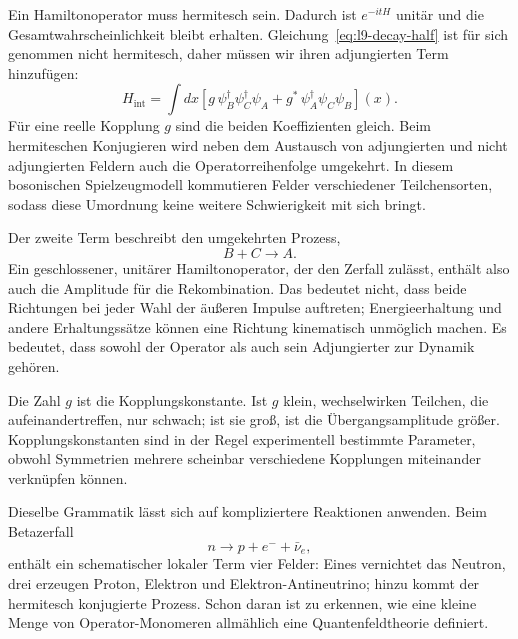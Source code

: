 Ein Hamiltonoperator muss hermitesch sein. Dadurch ist \(e^{-itH}\) unitär und die Gesamtwahrscheinlichkeit bleibt erhalten. Gleichung~\eqref{eq:l9-decay-half} ist für sich genommen nicht hermitesch, daher müssen wir ihren adjungierten Term hinzufügen:
\begin{equation}
H_{\mathrm{int}}
=\int dx\left[
g\,\psi_B^\dagger\psi_C^\dagger\psi_A
+g^*\,\psi_A^\dagger\psi_C\psi_B
\right](x).
\label{eq:l9-hermitian-vertex}
\end{equation}
Für eine reelle Kopplung \(g\) sind die beiden Koeffizienten gleich. Beim hermiteschen Konjugieren wird neben dem Austausch von adjungierten und nicht adjungierten Feldern auch die Operatorreihenfolge umgekehrt. In diesem bosonischen Spielzeugmodell kommutieren Felder verschiedener Teilchensorten, sodass diese Umordnung keine weitere Schwierigkeit mit sich bringt.

Der zweite Term beschreibt den umgekehrten Prozess,
\begin{equation}
B+C\longrightarrow A.
\end{equation}
Ein geschlossener, unitärer Hamiltonoperator, der den Zerfall zulässt, enthält also auch die Amplitude für die Rekombination. Das bedeutet nicht, dass beide Richtungen bei jeder Wahl der äußeren Impulse auftreten; Energieerhaltung und andere Erhaltungssätze können eine Richtung kinematisch unmöglich machen. Es bedeutet, dass sowohl der Operator als auch sein Adjungierter zur Dynamik gehören.

\begin{classroomqa}\end{classroomqa}

Die Zahl \(g\) ist die Kopplungskonstante. Ist \(g\) klein, wechselwirken Teilchen, die aufeinandertreffen, nur schwach; ist sie groß, ist die Übergangsamplitude größer. Kopplungskonstanten sind in der Regel experimentell bestimmte Parameter, obwohl Symmetrien mehrere scheinbar verschiedene Kopplungen miteinander verknüpfen können.

Dieselbe Grammatik lässt sich auf kompliziertere Reaktionen anwenden. Beim Betazerfall
\begin{equation}
n\longrightarrow p+e^-+\bar\nu_e,
\end{equation}
enthält ein schematischer lokaler Term vier Felder: Eines vernichtet das Neutron, drei erzeugen Proton, Elektron und Elektron-Antineutrino; hinzu kommt der hermitesch konjugierte Prozess. Schon daran ist zu erkennen, wie eine kleine Menge von Operator-Monomeren allmählich eine Quantenfeldtheorie definiert.

